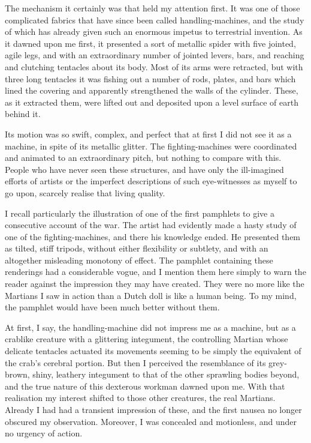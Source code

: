 The mechanism it certainly was that held my attention first. It was
one of those complicated fabrics that have since been called
handling-machines, and the study of which has already given such an
enormous impetus to terrestrial invention. As it dawned upon me
first, it presented a sort of metallic spider with five jointed,
agile legs, and with an extraordinary number of jointed levers,
bars, and reaching and clutching tentacles about its body. Most of
its arms were retracted, but with three long tentacles it was
fishing out a number of rods, plates, and bars which lined the
covering and apparently strengthened the walls of the cylinder.
These, as it extracted them, were lifted out and deposited upon a
level surface of earth behind it.

Its motion was so swift, complex, and perfect that at first I did
not see it as a machine, in spite of its metallic glitter. The
fighting-machines were coordinated and animated to an extraordinary
pitch, but nothing to compare with this. People who have never seen
these structures, and have only the ill-imagined efforts of artists
or the imperfect descriptions of such eye-witnesses as myself to go
upon, scarcely realise that living quality.

I recall particularly the illustration of one of the first
pamphlets to give a consecutive account of the war. The artist had
evidently made a hasty study of one of the fighting-machines, and
there his knowledge ended. He presented them as tilted, stiff
tripods, without either flexibility or subtlety, and with an
altogether misleading monotony of effect. The pamphlet containing
these renderings had a considerable vogue, and I mention them here
simply to warn the reader against the impression they may have
created. They were no more like the Martians I saw in action than a
Dutch doll is like a human being. To my mind, the pamphlet would
have been much better without them.

At first, I say, the handling-machine did not impress me as a
machine, but as a crablike creature with a glittering integument,
the controlling Martian whose delicate tentacles actuated its
movements seeming to be simply the equivalent of the crab's
cerebral portion. But then I perceived the resemblance of its
grey-brown, shiny, leathery integument to that of the other
sprawling bodies beyond, and the true nature of this dexterous
workman dawned upon me. With that realisation my interest shifted
to those other creatures, the real Martians. Already I had had a
transient impression of these, and the first nausea no longer
obscured my observation. Moreover, I was concealed and motionless,
and under no urgency of action.

